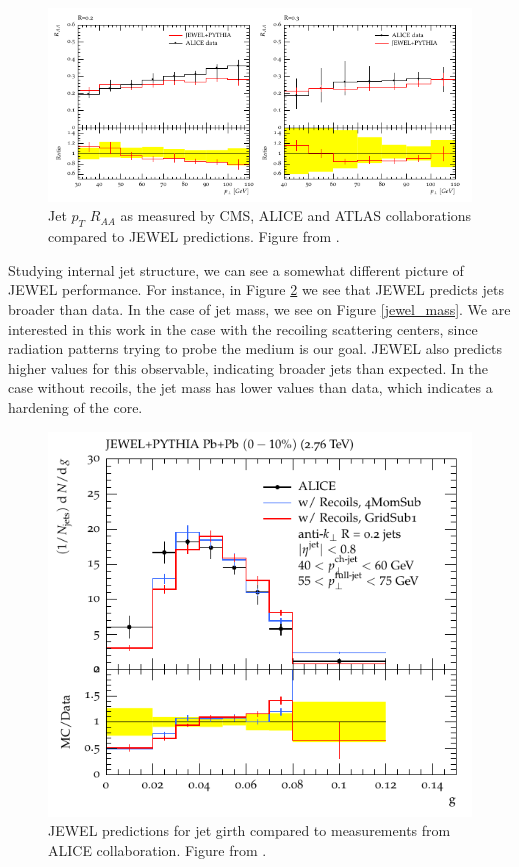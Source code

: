 \begin{figure}
\includegraphics[width=1.0\textwidth]{images/jewel_jetpt_supression.png}
\caption[JEWEL prediction of $R_{AA}$ for the jet $p_t$.]{Jet $p_T$ $R_{AA}$ as measured by CMS, ALICE and ATLAS collaborations compared to JEWEL predictions. Figure from \cite{zapp_perturbative_2013}.}
\label{jewel_jetpt_supression}
\end{figure}

Studying internal jet structure, we can see a somewhat different picture of JEWEL performance. For instance, in Figure \ref{jewel_girth} we see that JEWEL predicts jets broader than data. In the case of jet mass, we see on Figure \ref{jewel_mass}. We are interested in this work in the case with the recoiling scattering centers, since radiation patterns trying to probe the medium is our goal. JEWEL also predicts higher values for this observable, indicating broader jets than expected. In the case without recoils, the jet mass has lower values than data, which indicates a hardening of the core.

\begin{figure}
\includegraphics[width=1.0\textwidth]{images/jewel_girth.png}
\caption[JEWEL prediction for girth.]{JEWEL predictions for jet girth compared to measurements from ALICE collaboration. Figure from \cite{elayavalli_medium_2017}.}
\label{jewel_girth}
\end{figure}

